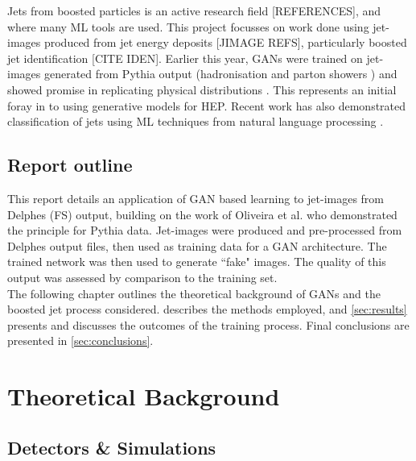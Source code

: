 \documentclass{report}
\begin{document}
Jets from boosted particles is an active research field [REFERENCES], and where many ML tools are used.  This project focusses on work done using jet-images produced from jet energy deposits [JIMAGE REFS], particularly boosted jet identification [CITE IDEN]. Earlier this year, GANs were trained on jet-images generated from Pythia output (hadronisation and parton showers \cite{pythia}) and showed promise in replicating physical distributions \cite{de2017learning}. This represents an initial foray in to using generative models for HEP. Recent work has also demonstrated classification of jets using ML techniques from natural language processing \cite{louppe2017qcd}.

\section{Report outline}

This report details an application of GAN based learning to jet-images from Delphes (FS) output, building on the work of Oliveira et al. \cite{de2017learning} who demonstrated the principle for Pythia data. Jet-images were produced and pre-processed from Delphes output files, then used as training data for a GAN architecture. The trained network was then used to generate ``fake" images. The quality of this output was assessed by comparison to the training set. \\

The following chapter outlines the theoretical background of GANs and the boosted jet process considered.  describes the methods employed, and \cref{sec:results} presents and discusses the outcomes of the training process. Final conclusions are presented in \cref{sec:conclusions}.
	 
\chapter{Theoretical Background}
\label{sec:theory}


\section{Detectors \& Simulations}
\label{sec:detector}
\end{document}
